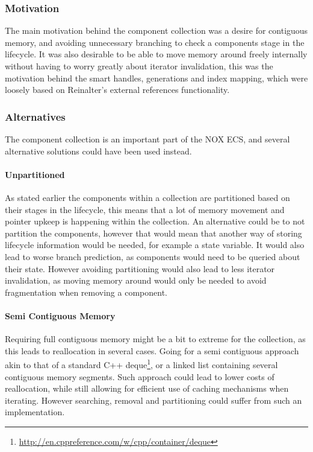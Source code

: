 \subsubsection{Motivation}
The main motivation behind the component collection was a desire for contiguous memory, and avoiding unnecessary
branching to check a components stage in the lifecycle.
It was also desirable to be able to move memory around freely internally without having to worry greatly about
iterator invalidation, this was the motivation behind the smart handles, generations and index mapping, which were loosely based
on Reinalter\cite{molecular_matters_dod_external_references}'s external references functionality.

\subsubsection{Alternatives}
The component collection is an important part of the NOX ECS, and several alternative solutions could have been used instead.

\paragraph{Unpartitioned}
As stated earlier the components within a collection are partitioned based on their stages in the lifecycle,
this means that a lot of memory movement and pointer upkeep is happening within the collection.
An alternative could be to not partition the components, however that would mean that another way of storing
lifecycle information would be needed, for example a state variable.
It would also lead to worse branch prediction, as components would need to be queried about their state.
However avoiding partitioning would also lead to less iterator invalidation, as moving memory around would
only be needed to avoid fragmentation when removing a component.

\paragraph{Semi Contiguous Memory}
Requiring full contiguous memory might be a bit to extreme for the collection, as this leads to
reallocation in several cases. Going for a semi contiguous approach akin to that of a standard C++ deque\footnote{\url{http://en.cppreference.com/w/cpp/container/deque}},
or a linked list containing several contiguous memory segments.
Such approach could lead to lower costs of reallocation, while still allowing for efficient use of caching mechanisms
when iterating.
However searching, removal and partitioning could suffer from such an implementation.

